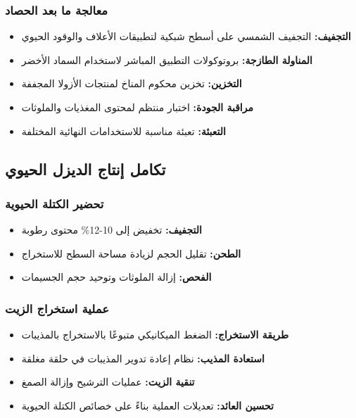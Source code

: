\subsubsection{معالجة ما بعد الحصاد}
\begin{itemize}
    \item \textbf{التجفيف:} التجفيف الشمسي على أسطح شبكية لتطبيقات الأعلاف والوقود الحيوي
    \item \textbf{المناولة الطازجة:} بروتوكولات التطبيق المباشر لاستخدام السماد الأخضر
    \item \textbf{التخزين:} تخزين محكوم المناخ لمنتجات الأزولا المجففة
    \item \textbf{مراقبة الجودة:} اختبار منتظم لمحتوى المغذيات والملوثات
    \item \textbf{التعبئة:} تعبئة مناسبة للاستخدامات النهائية المختلفة
\end{itemize}

\subsection{تكامل إنتاج الديزل الحيوي}

\subsubsection{تحضير الكتلة الحيوية}
\begin{itemize}
    \item \textbf{التجفيف:} تخفيض إلى 10-12\% محتوى رطوبة
    \item \textbf{الطحن:} تقليل الحجم لزيادة مساحة السطح للاستخراج
    \item \textbf{الفحص:} إزالة الملوثات وتوحيد حجم الجسيمات
\end{itemize}

\subsubsection{عملية استخراج الزيت}
\begin{itemize}
    \item \textbf{طريقة الاستخراج:} الضغط الميكانيكي متبوعًا بالاستخراج بالمذيبات
    \item \textbf{استعادة المذيب:} نظام إعادة تدوير المذيبات في حلقة مغلقة
    \item \textbf{تنقية الزيت:} عمليات الترشيح وإزالة الصمغ
    \item \textbf{تحسين العائد:} تعديلات العملية بناءً على خصائص الكتلة الحيوية
\end{itemize}

